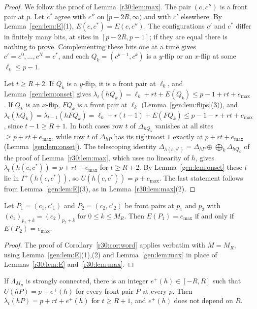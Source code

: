 \begin{proof}
We follow the proof of Lemma~\ref{r30:lem:max}. The pair $(c,c'')$ is a front pair at $p$. Let $c^*$ agree with $c''$ on $[p-2R,\infty)$ and with $c'$ elsewhere. By Lemma~\ref{gen:lem:E}(1), $E(c,c^*)=E(c,c'')$. The configurations $c'$ and $c^*$ differ in finitely many bits, at sites in $[p-2R,p-1]$; if they are equal there is nothing to prove. Complementing these bits one at a time gives $c'=c^0,\dots,c^N=c^*$, and each $Q_k=(c^{k-1},c^k)$ is a $y$-flip or an $x$-flip at some $\ell_k\le p-1$.

Let $t\ge R+2$. If $Q_k$ is a $y$-flip, it is a front pair at $\ell_k$, and Lemma~\ref{gen:lem:onset} gives $\lambda_t(hQ_k)=\ell_k+rt+E(Q_k)\le p-1+rt+e_{\max}$. If $Q_k$ is an $x$-flip, $FQ_k$ is a front pair at $\ell_k$ (Lemma~\ref{gen:lem:flips}(3)), and $\lambda_t(hQ_k)=\lambda_{t-1}(hFQ_k)=\ell_k+r(t-1)+E(FQ_k)\le p-1-r+rt+e_{\max}$, since $t-1\ge R+1$. In both cases row $t$ of $\Delta_{hQ_k}$ vanishes at all sites $\ge p+rt+e_{\max}$, while row $t$ of $\Delta_{hP}$ has its rightmost $1$ exactly at $p+rt+e_{\max}$ (Lemma~\ref{gen:lem:onset}). The telescoping identity $\Delta_{h(c,c^*)}=\Delta_{hP}\oplus\bigoplus_k\Delta_{hQ_k}$ of the proof of Lemma~\ref{r30:lem:max}, which uses no linearity of $h$, gives $\lambda_t(h(c,c^*))=p+rt+e_{\max}$ for $t\ge R+2$. By Lemma~\ref{gen:lem:onset} these $t$ lie in $I^+(h(c,c^*))$, so $U(h(c,c^*))=p+e_{\max}$. The last statement follows from Lemma~\ref{gen:lem:E}(3), as in Lemma~\ref{r30:lem:max}(2).
\end{proof}

\begin{corollary}\label{gen:cor:word}
Let $P_1=(c_1,c'_1)$ and $P_2=(c_2,c'_2)$ be front pairs at $p_1$ and $p_2$ with $(c_1)_{p_1+k}=(c_2)_{p_2+k}$ for $0\le k\le M_R$. Then $E(P_1)=e_{\max}$ if and only if $E(P_2)=e_{\max}$.
\end{corollary}

\begin{proof}
The proof of Corollary~\ref{r30:cor:word} applies verbatim with $M=M_R$, using Lemma~\ref{gen:lem:E}(1),(2) and Lemma~\ref{gen:lem:max} in place of Lemmas~\ref{r30:lem:E} and~\ref{r30:lem:max}.
\end{proof}

\begin{theorem}\label{gen:thm:front}
If $\Lambda_{M_R}$ is strongly connected, there is an integer $e^+(h)\in[-R,R]$ such that $U(hP)=p+e^+(h)$ for every front pair $P$ at every $p$. Then $\lambda_t(hP)=p+rt+e^+(h)$ for $t\ge R+1$, and $e^+(h)$ does not depend on $R$.
\end{theorem}

